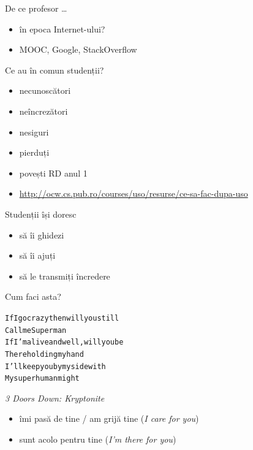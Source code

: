 \documentclass{beamer}
\begin{document}
\begin{frame}{De ce profesor \ldots}
  \begin{itemize}
    \pause
    \item în epoca Internet-ului?
    \pause
    \item MOOC, Google, StackOverflow
  \end{itemize}
\end{frame}

\begin{frame}{Ce au în comun studenții?}
  \begin{itemize}
    \pause
    \item necunoscători
    \pause
    \item neîncrezători
    \pause
    \item nesiguri
    \pause
    \item pierduți
    \pause
    \item povești RD anul 1
    \pause
    \item \url{http://ocw.cs.pub.ro/courses/uso/resurse/ce-sa-fac-dupa-uso}
  \end{itemize}
\end{frame}

\begin{frame}{Studenții își doresc}
  \begin{itemize}
    \item să îi ghidezi
    \item să îi ajuți
    \item să le transmiți încredere
  \end{itemize}
\end{frame}

\begin{frame}[fragile]{Cum faci asta?}
  \begin{alltt}
If I go crazy then will you still
Call me Superman
If I'm alive and well, will you be
There holding my hand
I'll keep you by my side with
My superhuman might
  \end{alltt} \hfill \textit{3 Doors Down: Kryptonite}
  \\
  \pause
  \begin{itemize}
    \item îmi pasă de tine / am grijă tine (\textit{I care for you})
    \item sunt acolo pentru tine (\textit{I'm there for you})
  \end{itemize}
\end{frame}
\end{document}
